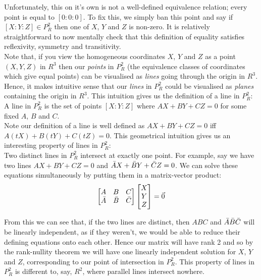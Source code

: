 \documentclass{article}
\begin{document}
Unfortunately, this on it's own is not a well-defined equivalence relation; every point is equal to $[0 : 0 : 0]$. To fix this, we simply ban this point and say if  $[X : Y : Z] \in P_R^2$  then one of $X$, $Y$ and $Z$ is non-zero. It is relatively straightforward to now mentally check that this definition of equality satisfies reflexivity, symmetry and transitivity.\\

Note that, if you view the homogeneous coordinates $X$, $Y$ and $Z$ as a point $(X, Y, Z)$ in $R^3$ then our \emph{points} in $P_R^2$ (the equivalence classes of coordinates which give equal points) can be visualised as \emph{lines} going through the origin in $R^3$. Hence, it makes intuitive sense that our \emph{lines} in $P_R^2$ could be visualised as \emph{planes} containing the origin in $R^3$. This intuition gives us the definition of a line in $P_R^2$:\\

A line in $P_R^2$ is the set of points $[X : Y : Z]$ where $AX + BY + CZ = 0$ for some fixed $A$, $B$ and $C$. \\

Note our definition of a line is well defined as  $AX + BY + CZ = 0$ iff  $A(tX) + B(tY) + C(tZ) = 0$. This geometrical intuition gives us an interesting property of lines in $P_R^2$: \\

Two distinct lines in $P_R^2$ intersect at exactly one point. For example, say we have two lines $AX + BY + CZ = 0$ and $\Bar{A}X + \bar{B}Y + \bar{C}Z = 0$. We can solve these equations simultaneously by putting them in a matrix-vector product:\\

$$ \begin{bmatrix}
A & B & C \\
\Bar{A} & \Bar{B} & \Bar{C} 
\end{bmatrix} 
\begin{bmatrix}
X \\
Y \\
Z \\
\end{bmatrix} 
= \vec{0}
$$

From this we can see that, if the two lines are distinct, then $A  B  C$ and
$\Bar{A}  \Bar{B}  \Bar{C} $ will be linearly independent, as if they weren't, we would be able to reduce their defining equations onto each other. Hence our matrix will have rank 2 and so by the rank-nullity theorem we will have one linearly independent solution for $X$, $Y$ and $Z$, corresponding to our point of intersection in $P_R^2$. This property of lines in $P_R^2$ is different to, say, $R^2$, where parallel lines intersect nowhere.
\end{document}
